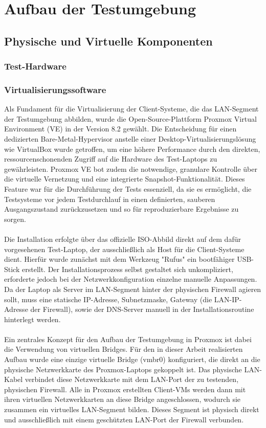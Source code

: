 \chapter{Aufbau der Testumgebung}
\section{Physische und Virtuelle Komponenten}
\subsection{Test-Hardware}
\subsection{Virtualisierungssoftware}

Als Fundament für die Virtualisierung der Client-Systeme, die das LAN-Segment der Testumgebung abbilden, wurde die Open-Source-Plattform Proxmox Virtual Environment (VE) in der Version 8.2 gewählt. Die Entscheidung für einen dedizierten Bare-Metal-Hypervisor anstelle einer Desktop-Virtualisierungslösung wie VirtualBox wurde getroffen, um eine höhere Performance durch den direkten, ressourcenschonenden Zugriff auf die Hardware des Test-Laptops zu gewährleisten. Proxmox VE bot zudem die notwendige, granulare Kontrolle über die virtuelle Vernetzung und eine integrierte Snapshot-Funktionalität. Dieses Feature war für die Durchführung der Tests essenziell, da sie es ermöglicht, die Testsysteme vor jedem Testdurchlauf in einen definierten, sauberen Ausgangszustand zurückzusetzen und so für reproduzierbare Ergebnisse zu sorgen.\\\\

Die Installation erfolgte über das offizielle ISO-Abbild direkt auf dem dafür vorgesehenen Test-Laptop, der ausschließlich als Host für die Client-Systeme dient. Hierfür wurde zunächst mit dem Werkzeug "Rufus" ein bootfähiger USB-Stick erstellt. Der Installationsprozess selbst gestaltet sich unkompliziert, erforderte jedoch bei der Netzwerkkonfiguration einzelne manuelle Anpassungen. Da der Laptop als Server im LAN-Segment hinter der physischen Firewall agieren sollt, muss eine statische IP-Adresse, Subnetzmaske, Gateway (die LAN-IP-Adresse der Firewall), sowie der DNS-Server manuell in der Installationsroutine hinterlegt werden.\\\\

Ein zentrales Konzept für den Aufbau der Testumgebung in Proxmox ist dabei die Verwendung von virtuellen Bridges. Für den in dieser Arbeit realisierten Aufbau wurde eine einzige virtuelle Bridge (vmbr0) konfiguriert, die direkt an die physische Netzwerkkarte des Proxmox-Laptops gekoppelt ist. Das physische LAN-Kabel verbindet diese Netzwerkkarte mit dem LAN-Port der zu testenden, physischen Firewall. Alle in Proxmox erstellten Client-VMs werden dann mit ihren virtuellen Netzwerkkarten an diese Bridge angeschlossen, wodurch sie zusammen ein virtuelles LAN-Segment bilden. Dieses Segment ist physisch direkt und ausschließlich mit einem geschützten LAN-Port der Firewall verbunden.\\

